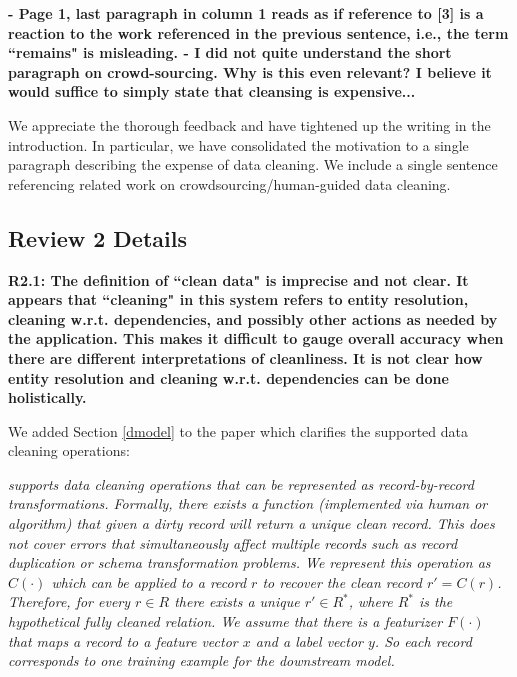 \vspace{0.5em}

\noindent\textbf{- Page 1, last paragraph in column 1 reads as if reference to [3] is a reaction to the work referenced in the previous sentence, i.e., the term ``remains" is misleading.
- I did not quite understand the short paragraph on crowd-sourcing. Why is this even relevant?
 I believe it would suffice to simply state that cleansing is expensive...}

We appreciate the thorough feedback and have tightened up the writing in the introduction. In particular, we have consolidated the motivation to a single paragraph describing the expense of data cleaning. We include a single sentence referencing related work on crowdsourcing/human-guided data cleaning.


\subsection*{Review 2 Details}

\noindent\textbf{R2.1: The definition of ``clean data" is imprecise and not clear. It appears that ``cleaning" in this system refers to entity resolution, cleaning w.r.t. dependencies, and possibly other actions as needed by the application. This makes it difficult to gauge overall accuracy when there are different interpretations of cleanliness. It is not clear how entity resolution and cleaning w.r.t. dependencies can be done holistically.}

We added Section \ref{dmodel} to the paper which clarifies the supported data cleaning operations:

\emph{\sys supports data cleaning operations that can be represented as record-by-record transformations.
Formally, there exists a function (implemented via human or algorithm) that given a dirty record will return a unique clean record.
This does not cover errors that simultaneously affect multiple records such as record duplication or schema transformation problems.
We represent this operation as $C(\cdot)$ which can be applied to a record $r$ to recover the clean record $r' = C(r)$.
Therefore, for every $r \in R$ there exists a unique $r' \in R^*$, where $R^*$ is the hypothetical fully cleaned relation.
We assume that there is a featurizer $F(\cdot)$ that maps a record to a feature vector $x$ and a label vector $y$.
So each record corresponds to one training example for the downstream model.}

\vspace{0.5em}

